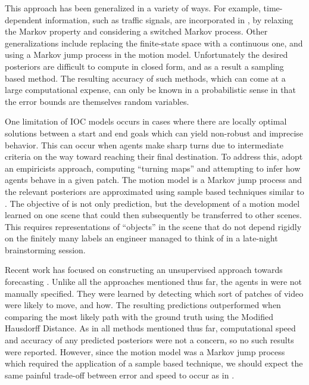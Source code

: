 \documentclass[letterpaper,10pt,conference]{ieeeconf}
\begin{document}
This approach has been generalized in a variety of ways.
For example, time-dependent information, such as traffic signals, are incorporated in \cite{Karasev2016}, by relaxing the Markov property and considering a switched Markov process.
Other generalizations include replacing the finite-state space with a continuous one, and using a Markov jump process in the motion model.
Unfortunately the desired posteriors are difficult to compute in closed form, and as a result a sampling based method.
The resulting accuracy of such methods, which can come at a large computational expense, can only be known in a probabilistic sense in that the error bounds are themselves random variables.

One limitation of IOC models occurs in cases where there are locally optimal solutions between a start and end goals which can yield non-robust and imprecise behavior.
This can occur when agents make sharp turns due to intermediate criteria on the way toward reaching their final destination.
To address this, \cite{Ballan2016} adopt an empiricists approach, computing ``turning maps'' and attempting to infer how agents behave in a given patch.
The motion model is a Markov jump process and the relevant posteriors are approximated using sample based techniques similar to \cite{Karasev2016}.
The objective of \cite{Ballan2016} is not only prediction, but the development of a motion model learned on one scene that could then subsequently be transferred to other scenes. 
This requires representations of ``objects'' in the scene that do not depend rigidly on the finitely many labels an engineer managed to think of in a late-night brainstorming session.

Recent work has focused on constructing an unsupervised approach towards forecasting  \cite{Walker2014}.
Unlike all the approaches mentioned thus far, the agents in \cite{Walker2014} were not manually specified.
They were learned by detecting which sort of patches of video were likely to move, and how.
The resulting predictions outperformed \cite{Kitani2012} when comparing the most likely path with the ground truth using the Modified Hausdorff Distance.
As in all methods mentioned thus far, computational speed and accuracy of any predicted posteriors were not a concern, so no such results were reported.
However, since the motion model was a Markov jump process which required the application of a sample based technique, we should expect the same painful trade-off between error and speed to occur as in \cite{Karasev2016,Ballan2016}.
\end{document}
